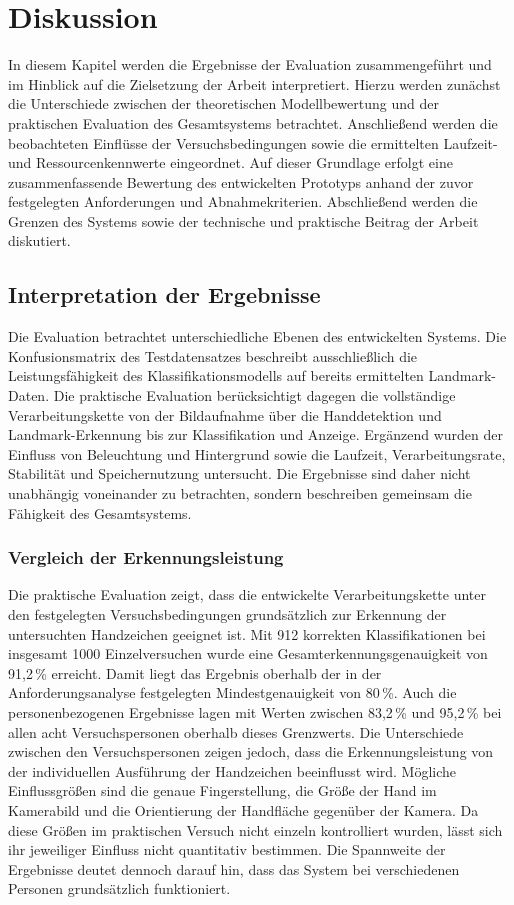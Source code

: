 \chapter{Diskussion}\label{ch:diskussion}

In diesem Kapitel werden die Ergebnisse der Evaluation zusammengeführt und im Hinblick auf die Zielsetzung der Arbeit interpretiert. Hierzu werden zunächst die Unterschiede zwischen der theoretischen Modellbewertung und der praktischen Evaluation des Gesamtsystems betrachtet. Anschließend werden die beobachteten Einflüsse der Versuchsbedingungen sowie die ermittelten Laufzeit- und Ressourcenkennwerte eingeordnet. Auf dieser Grundlage erfolgt eine zusammenfassende Bewertung des entwickelten Prototyps anhand der zuvor festgelegten Anforderungen und Abnahmekriterien. Abschließend werden die Grenzen des Systems sowie der technische und praktische Beitrag der Arbeit diskutiert.

\section{Interpretation der Ergebnisse}\label{sec:interpretation}
%
Die Evaluation betrachtet unterschiedliche Ebenen des entwickelten Systems. Die Konfusionsmatrix des Testdatensatzes beschreibt ausschließlich die Leistungsfähigkeit des Klassifikationsmodells auf bereits ermittelten Landmark-Daten. Die praktische Evaluation berücksichtigt dagegen die vollständige Verarbeitungskette von der Bildaufnahme über die Handdetektion und Landmark-Erkennung bis zur Klassifikation und Anzeige. Ergänzend wurden der Einfluss von Beleuchtung und Hintergrund sowie die Laufzeit, Verarbeitungsrate, Stabilität und Speichernutzung untersucht. Die Ergebnisse sind daher nicht unabhängig voneinander zu betrachten, sondern beschreiben gemeinsam die Fähigkeit des Gesamtsystems.

\subsection{Vergleich der Erkennungsleistung}

Die praktische Evaluation zeigt, dass die entwickelte Verarbeitungskette unter den festgelegten Versuchsbedingungen grundsätzlich zur Erkennung der untersuchten Handzeichen geeignet ist. Mit 912 korrekten Klassifikationen bei insgesamt 1000 Einzelversuchen wurde eine Gesamterkennungsgenauigkeit von 91,2\,\% erreicht. Damit liegt das Ergebnis oberhalb der in der Anforderungsanalyse festgelegten Mindestgenauigkeit von 80\,\%. Auch die personenbezogenen Ergebnisse lagen mit Werten zwischen 83,2\,\% und 95,2\,\% bei allen 
acht Versuchspersonen oberhalb dieses Grenzwerts. Die Unterschiede zwischen den 
Versuchspersonen zeigen jedoch, dass die Erkennungsleistung von der individuellen 
Ausführung der Handzeichen beeinflusst wird. Mögliche Einflussgrößen sind die genaue 
Fingerstellung, die Größe der Hand im Kamerabild und die Orientierung der Handfläche 
gegenüber der Kamera. Da diese Größen im praktischen Versuch nicht einzeln kontrolliert 
wurden, lässt sich ihr jeweiliger Einfluss nicht quantitativ bestimmen. Die Spannweite der Ergebnisse deutet dennoch darauf hin, dass das System bei verschiedenen Personen grundsätzlich funktioniert.

